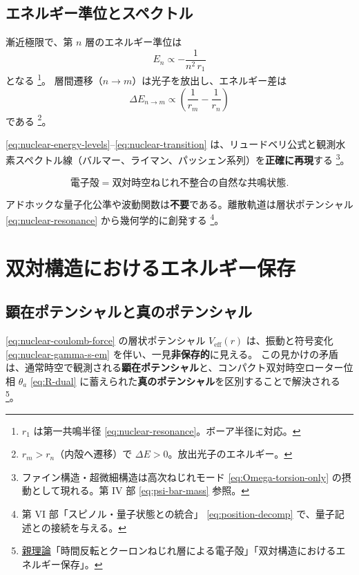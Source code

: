 \documentclass[dvipdfmx,a4paper,oneside]{jsbook}
\numberwithin{equation}{chapter}
\begin{document}
\subsection{エネルギー準位とスペクトル}

漸近極限で、第 \(n\) 層のエネルギー準位は
\begin{equation}
  E_n \propto -\frac{1}{n^{2}\, r_1}
  \label{eq:nuclear-energy-levels}
\end{equation}
となる \footnote{\(r_1\) は第一共鳴半径 \eqref{eq:nuclear-resonance}。ボーア半径に対応。}。
層間遷移（\(n \to m\)）は光子を放出し、エネルギー差は
\begin{equation}
  \Delta E_{n \to m} \propto \left(\frac{1}{r_m} - \frac{1}{r_n}\right)
  \label{eq:nuclear-transition}
\end{equation}
である \footnote{\(r_m > r_n\)（内殻へ遷移）で \(\Delta E > 0\)。放出光子のエネルギー。}。

\eqref{eq:nuclear-energy-levels}–\eqref{eq:nuclear-transition} は、リュードベリ公式と観測水素スペクトル線（バルマー、ライマン、パッシェン系列）を\textbf{正確に再現}する \footnote{ファイン構造・超微細構造は高次ねじれモード \eqref{eq:Omega-torsion-only} の摂動として現れる。第 IV 部 \eqref{eq:psi-bar-mass} 参照。}。

\begin{equation}
  \boxed{\;
  \text{電子殻} = \text{双対時空ねじれ不整合の自然な共鳴状態}.
  \;}
  \label{eq:nuclear-shells-emergent}
\end{equation}

アドホックな量子化公準や波動関数は\textbf{不要}である。離散軌道は層状ポテンシャル \eqref{eq:nuclear-resonance} から幾何学的に創発する \footnote{第 VI 部「スピノル・量子状態との統合」 \eqref{eq:position-decomp} で、量子記述との接続を与える。}。

\section{双対構造におけるエネルギー保存}

\subsection{顕在ポテンシャルと真のポテンシャル}

\eqref{eq:nuclear-coulomb-force} の層状ポテンシャル \(V_{\mathrm{eff}}(r)\) は、振動と符号変化 \eqref{eq:nuclear-gamma-s-em} を伴い、一見\textbf{非保存的}に見える。
この見かけの矛盾は、通常時空で観測される\textbf{顕在ポテンシャル}と、コンパクト双対時空ローター位相 \(\theta_a\) \eqref{eq:R-dual} に蓄えられた\textbf{真のポテンシャル}を区別することで解決される \footnote{\hyperref[sec:sister-manuscripts]{親理論}「時間反転とクーロンねじれ層による電子殻」「双対構造におけるエネルギー保存」。}。
\end{document}
